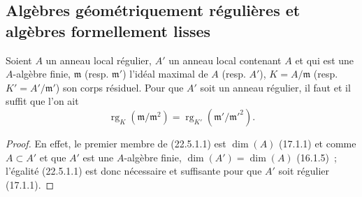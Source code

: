 \subsection{Algèbres géométriquement régulières et algèbres formellement lisses}
\label{subsection:0.22.5-fr}

\begin{proposition}[22.5.1]
\label{0.22.5.1-fr}
Soient $A$ un anneau local régulier, $A'$ un anneau local contenant $A$ et qui
est une $A$-algèbre finie, $\mathfrak m$ (resp. $\mathfrak m'$) l'idéal maximal
de $A$ (resp. $A'$), $K=A/\mathfrak m$ (resp. $K'=A'/\mathfrak m'$) son corps
résiduel. Pour que $A'$ soit un anneau régulier, il faut et il suffit que l'on
ait
\begin{equation}
\label{0.22.5.1.1-fr}
  \operatorname{rg}_K(\mathfrak m/\mathfrak m^2)
  =\operatorname{rg}_{K'}(\mathfrak m'/\mathfrak m'^2).
  \tag{22.5.1.1}
\end{equation}
\end{proposition}

\begin{proof}
En effet, le premier membre de (22.5.1.1) est $\dim(A)$ (17.1.1) et comme
$A\subset A'$ et que $A'$ est une $A$-algèbre finie,
$\dim(A')=\dim(A)$ (16.1.5)~; l'égalité (22.5.1.1) est donc nécessaire et
suffisante pour que $A'$ soit régulier (17.1.1).
\end{proof}

